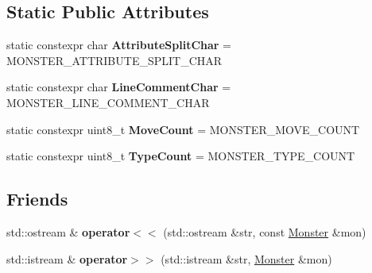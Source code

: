 \subsection*{Static Public Attributes}
\begin{DoxyCompactItemize}
\item 
\mbox{\label{classmonsterbattle_1_1monster_1_1Monster_a99a5800761852f2d96dbff809a1d8082}} 
static constexpr char {\bfseries Attribute\+Split\+Char} = M\+O\+N\+S\+T\+E\+R\+\_\+\+A\+T\+T\+R\+I\+B\+U\+T\+E\+\_\+\+S\+P\+L\+I\+T\+\_\+\+C\+H\+AR
\item 
\mbox{\label{classmonsterbattle_1_1monster_1_1Monster_a6077c69a48c7c632b82c6f35d46d96a7}} 
static constexpr char {\bfseries Line\+Comment\+Char} = M\+O\+N\+S\+T\+E\+R\+\_\+\+L\+I\+N\+E\+\_\+\+C\+O\+M\+M\+E\+N\+T\+\_\+\+C\+H\+AR
\item 
\mbox{\label{classmonsterbattle_1_1monster_1_1Monster_aab317703a1ce07167865723e80a87b8a}} 
static constexpr uint8\+\_\+t {\bfseries Move\+Count} = M\+O\+N\+S\+T\+E\+R\+\_\+\+M\+O\+V\+E\+\_\+\+C\+O\+U\+NT
\item 
\mbox{\label{classmonsterbattle_1_1monster_1_1Monster_a7341ae89f73fcf9762fb19960d2a53e5}} 
static constexpr uint8\+\_\+t {\bfseries Type\+Count} = M\+O\+N\+S\+T\+E\+R\+\_\+\+T\+Y\+P\+E\+\_\+\+C\+O\+U\+NT
\end{DoxyCompactItemize}
\subsection*{Friends}
\begin{DoxyCompactItemize}
\item 
\mbox{\label{classmonsterbattle_1_1monster_1_1Monster_a8d266a52461356729fcfe1b83626cb35}} 
std\+::ostream \& {\bfseries operator$<$$<$} (std\+::ostream \&str, const \hyperlink{classmonsterbattle_1_1monster_1_1Monster}{Monster} \&mon)
\item 
\mbox{\label{classmonsterbattle_1_1monster_1_1Monster_a787223edf2a4383bc989fe4f7fdbe87a}} 
std\+::istream \& {\bfseries operator$>$$>$} (std\+::istream \&str, \hyperlink{classmonsterbattle_1_1monster_1_1Monster}{Monster} \&mon)
\end{DoxyCompactItemize}


